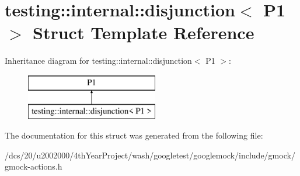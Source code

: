 \hypertarget{structtesting_1_1internal_1_1disjunction_3_01P1_01_4}{}\section{testing\+:\+:internal\+:\+:disjunction$<$ P1 $>$ Struct Template Reference}
\label{structtesting_1_1internal_1_1disjunction_3_01P1_01_4}
Inheritance diagram for testing\+:\+:internal\+:\+:disjunction$<$ P1 $>$\+:\begin{figure}[H]
\begin{center}
\leavevmode
\includegraphics[height=2.000000cm]{structtesting_1_1internal_1_1disjunction_3_01P1_01_4}
\end{center}
\end{figure}


The documentation for this struct was generated from the following file\+:\begin{DoxyCompactItemize}
\item 
/dcs/20/u2002000/4th\+Year\+Project/wash/googletest/googlemock/include/gmock/gmock-\/actions.\+h\end{DoxyCompactItemize}
